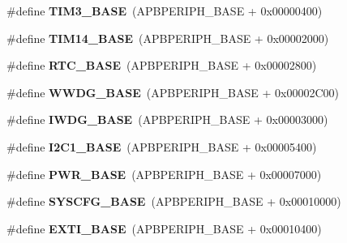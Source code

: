 \begin{DoxyCompactItemize}
\#define {\bfseries T\+I\+M3\+\_\+\+B\+A\+SE}~(A\+P\+B\+P\+E\+R\+I\+P\+H\+\_\+\+B\+A\+SE + 0x00000400)
\item 
\mbox{\label{group___peripheral__memory__map_ga862855347d6e1d92730dfe17ee8e90b8}} 
\#define {\bfseries T\+I\+M14\+\_\+\+B\+A\+SE}~(A\+P\+B\+P\+E\+R\+I\+P\+H\+\_\+\+B\+A\+SE + 0x00002000)
\item 
\mbox{\label{group___peripheral__memory__map_ga4265e665d56225412e57a61d87417022}} 
\#define {\bfseries R\+T\+C\+\_\+\+B\+A\+SE}~(A\+P\+B\+P\+E\+R\+I\+P\+H\+\_\+\+B\+A\+SE + 0x00002800)
\item 
\mbox{\label{group___peripheral__memory__map_ga9a5bf4728ab93dea5b569f5b972cbe62}} 
\#define {\bfseries W\+W\+D\+G\+\_\+\+B\+A\+SE}~(A\+P\+B\+P\+E\+R\+I\+P\+H\+\_\+\+B\+A\+SE + 0x00002\+C00)
\item 
\mbox{\label{group___peripheral__memory__map_ga8543ee4997296af5536b007cd4748f55}} 
\#define {\bfseries I\+W\+D\+G\+\_\+\+B\+A\+SE}~(A\+P\+B\+P\+E\+R\+I\+P\+H\+\_\+\+B\+A\+SE + 0x00003000)
\item 
\mbox{\label{group___peripheral__memory__map_gacd72dbffb1738ca87c838545c4eb85a3}} 
\#define {\bfseries I2\+C1\+\_\+\+B\+A\+SE}~(A\+P\+B\+P\+E\+R\+I\+P\+H\+\_\+\+B\+A\+SE + 0x00005400)
\item 
\mbox{\label{group___peripheral__memory__map_gac691ec23dace8b7a649a25acb110217a}} 
\#define {\bfseries P\+W\+R\+\_\+\+B\+A\+SE}~(A\+P\+B\+P\+E\+R\+I\+P\+H\+\_\+\+B\+A\+SE + 0x00007000)
\item 
\mbox{\label{group___peripheral__memory__map_ga62246020bf3b34b6a4d8d0e84ec79d3d}} 
\#define {\bfseries S\+Y\+S\+C\+F\+G\+\_\+\+B\+A\+SE}~(A\+P\+B\+P\+E\+R\+I\+P\+H\+\_\+\+B\+A\+SE + 0x00010000)
\item 
\mbox{\label{group___peripheral__memory__map_ga87371508b3bcdcd98cd1ec629be29061}} 
\#define {\bfseries E\+X\+T\+I\+\_\+\+B\+A\+SE}~(A\+P\+B\+P\+E\+R\+I\+P\+H\+\_\+\+B\+A\+SE + 0x00010400)

\end{DoxyCompactItemize}
